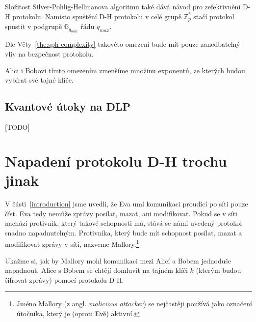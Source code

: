 \documentclass[
  program=infoi,
  biblatex,
  figures=false,
  glossaries,
  index
]{kidiplom}
\begin{document}
            \begin{remark}\label{rem:diffie-hellman-improved}
                
                Složitost Silver-Pohlig-Hellmanova algoritmu také dává návod pro zefektivnění D-H protokolu.
                Namísto spuštění D-H protokolu v celé grupě $\mathbb{Z}^*_p$ stačí protokol spustit
                v podgrupě $\mathbb{G}_{q_{max}}$ řádu $q_{max}$.
            

                Dle Věty~\ref{the:sph-complexity} takovéto omezení bude mít pouze zanedbatelný vliv na bezpečnost protokolu.

                Alici i Bobovi tímto omezením zmenšíme množinu exponentů, ze kterých budou vybírat své tajné klíče.

            \end{remark}


    \subsection{Kvantové útoky na DLP}

        [TODO]
    


\section{Napadení protokolu D-H trochu jinak}

    V části~\ref{introduction} jsme uvedli, že Eva umí komunikaci proudící po síti pouze číst. Eva tedy nemůže zprávy posílat, mazat, ani modifikovat.
    Pokud se v síti nachází protivník, který takové schopnosti má, stává se námi uvedený protokol snadno napadnutelným. Protivníka, který bude mít
    schopnost posílat, mazat a modifikovat zprávy v síti, nazveme Mallory.\footnote{Jméno Mallory (z angl. \emph{malicious attacker}) se nejčastěji používá jako
    označení útočníka, který je (oproti Evě) aktivní.}

    \bigskip

    Ukažme si, jak by Mallory mohl komunikaci mezi Alicí a Bobem jednoduše napadnout.
    Alice s Bobem se chtějí domluvit na tajném klíči $k$ (kterým budou šifrovat zprávy) pomocí protokolu D-H.
\end{document}
